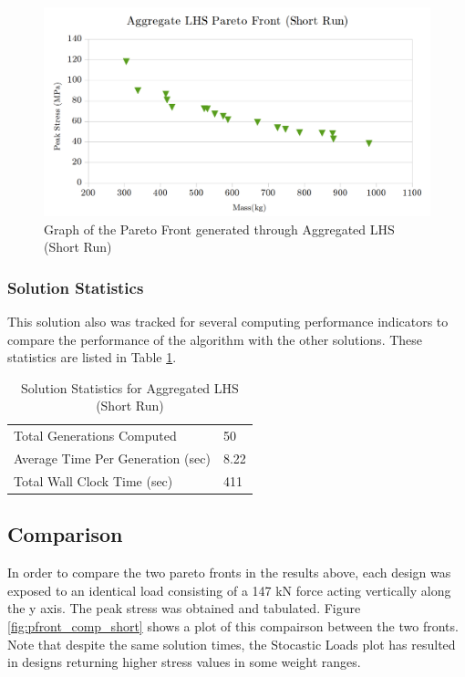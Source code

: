 \begin{figure}[!htbp]
\includegraphics[width=\textwidth]{img/pf_agg_short.png}
\caption{Graph of the Pareto Front generated through Aggregated LHS (Short Run)}
\label{fig:pfront_agg_short}
\end{figure}

\subsubsection{Solution Statistics}
This solution also was tracked for several computing performance indicators to compare the performance of the algorithm with the other solutions. These statistics are listed in Table \ref{tab:stat_agg_short}. 

\begin{table}[!htbp]
  \centering
  \begin{tabular}{|l|l|}
    \hline
	  Total Generations Computed & 50\\
    Average Time Per Generation (sec) & 8.22\\
    Total Wall Clock Time (sec)	 & 411\\
    \hline
  \end{tabular}
\caption{Solution Statistics for Aggregated LHS (Short Run)}
  \label{tab:stat_agg_short}
\end{table}

\subsection{Comparison}
In order to compare the two pareto fronts in the results above, each design was exposed to an identical load consisting of a 147 kN force acting vertically along the y axis. The peak stress was obtained and tabulated. Figure \ref{fig:pfront_comp_short} shows a plot of this compairson between the two fronts. Note that despite the same solution times, the Stocastic Loads plot has resulted in designs returning higher stress values in some weight ranges. 

